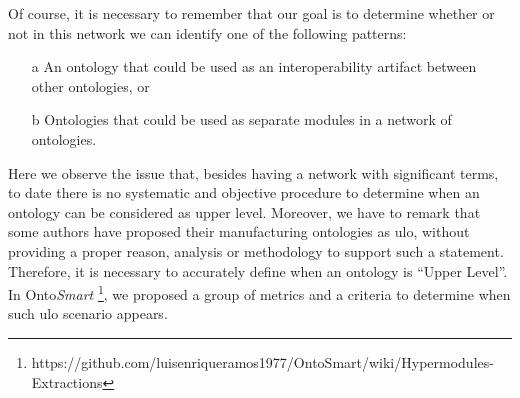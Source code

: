 Of course, it is necessary to remember that our goal is to determine whether or not in this network we can identify one of the following patterns:

\begin{itemize}
	\item[a] An ontology that could be used as an interoperability artifact between other ontologies, or
	\item[b] Ontologies that could be used as separate modules in a network of ontologies. 
\end{itemize}


Here we observe the issue that, besides having a network with significant terms, to date there is no systematic and objective procedure to determine   when an ontology can be   considered as upper level. Moreover, we have to remark that some authors have proposed their manufacturing ontologies as \gls{ulo}, without providing a proper reason, analysis or methodology to support such a statement. Therefore, it is necessary to accurately define when an ontology is “Upper Level”. In Onto\textit{Smart} \footnote{https://github.com/luisenriqueramos1977/OntoSmart/wiki/Hypermodules-Extractions}, we proposed a group of metrics and a criteria to determine when such \gls{ulo} scenario appears.
	
	


